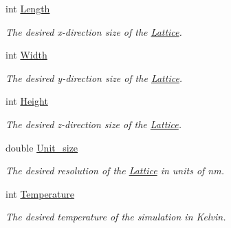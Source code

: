 \begin{DoxyCompactItemize}
int \hyperlink{struct_parameters___simulation_a038f418e1b2e4fec3fc6a8336f8b23de}{Length}
\begin{DoxyCompactList}\small\item\em The desired x-\/direction size of the \hyperlink{class_lattice}{Lattice}. \end{DoxyCompactList}\item 
\mbox{\label{struct_parameters___simulation_aab42f7eb6b5ec1916475d9022ed5165f}} 
int \hyperlink{struct_parameters___simulation_aab42f7eb6b5ec1916475d9022ed5165f}{Width}
\begin{DoxyCompactList}\small\item\em The desired y-\/direction size of the \hyperlink{class_lattice}{Lattice}. \end{DoxyCompactList}\item 
\mbox{\label{struct_parameters___simulation_aa1ffb86ac22065dbbb58196db95b3199}} 
int \hyperlink{struct_parameters___simulation_aa1ffb86ac22065dbbb58196db95b3199}{Height}
\begin{DoxyCompactList}\small\item\em The desired z-\/direction size of the \hyperlink{class_lattice}{Lattice}. \end{DoxyCompactList}\item 
\mbox{\label{struct_parameters___simulation_ab5dda6868bc9359d97a614f027734349}} 
double \hyperlink{struct_parameters___simulation_ab5dda6868bc9359d97a614f027734349}{Unit\+\_\+size}
\begin{DoxyCompactList}\small\item\em The desired resolution of the \hyperlink{class_lattice}{Lattice} in units of nm. \end{DoxyCompactList}\item 
\mbox{\label{struct_parameters___simulation_aad5bdf64239620d1b214c49532dba743}} 
int \hyperlink{struct_parameters___simulation_aad5bdf64239620d1b214c49532dba743}{Temperature}
\begin{DoxyCompactList}\small\item\em The desired temperature of the simulation in Kelvin. \end{DoxyCompactList}\item 
\mbox{\label{struct_parameters___simulation_af55371ca9e7027e799f5be46e40eacc1}} 

\end{DoxyCompactItemize}
